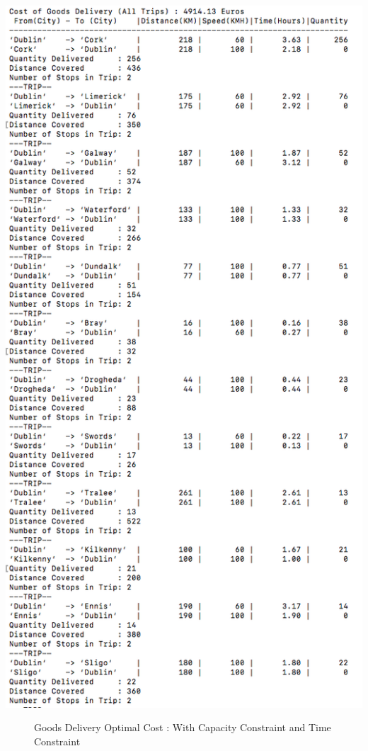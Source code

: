 \documentclass[a4paper&11pt]{article}
\begin{document}
\begin{center}
\includegraphics[scale=0.8]{20fig4.png}
\begin{figure}[H]
\caption{Goods Delivery Optimal Cost :  With Capacity Constraint  and Time Constraint}
\label{fig:20fig4}
\end{figure}
\end{center}
\end{document}
